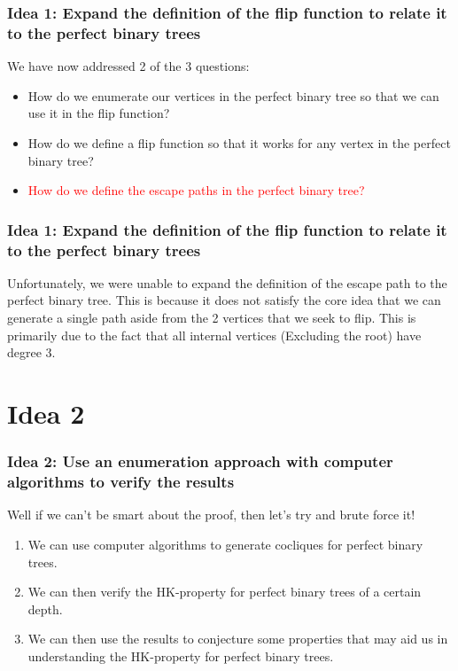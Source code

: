 \documentclass[10pt,]{beamer}
\theoremstyle{conjectureStyle}
\theoremstyle{notationStyle}
\theoremstyle{claimStyle}
\begin{document}
\begin{frame}\frametitle{Idea 1: Expand the definition of the flip function to relate it to the perfect binary trees}
    We have now addressed 2 of the 3 questions:
    \begin{itemize}
        \item \textcolor{textGreen}{How do we enumerate our vertices in the perfect binary tree so that we can use it in the flip function?}
        \item \textcolor{textGreen}{How do we define a flip function so that it works for any vertex in the perfect binary tree?}
        \item \textcolor{red}{How do we define the escape paths in the perfect binary tree?}
    \end{itemize}
\end{frame}

\begin{frame}\frametitle{Idea 1: Expand the definition of the flip function to relate it to the perfect binary trees}
    Unfortunately, we were unable to expand the definition of the escape path to the perfect binary tree. This is because it does not satisfy the core idea that we can generate a single path aside from the 2 vertices that we seek to flip. This is primarily due to the fact that all internal vertices (Excluding the root) have degree 3.
\end{frame}

\section{Idea 2}
\begin{frame}\frametitle{Idea 2: Use an enumeration approach with computer algorithms to verify the results}
    Well if we can't be smart about the proof, then let's try and brute force it!

    \begin{enumerate}[<+->]
        \item We can use computer algorithms to generate cocliques for perfect binary trees.
        \item We can then verify the HK-property for perfect binary trees of a certain depth.
        \item We can then use the results to conjecture some properties that may aid us in understanding the HK-property for perfect binary trees.
    \end{enumerate}
\end{frame}
\end{document}
